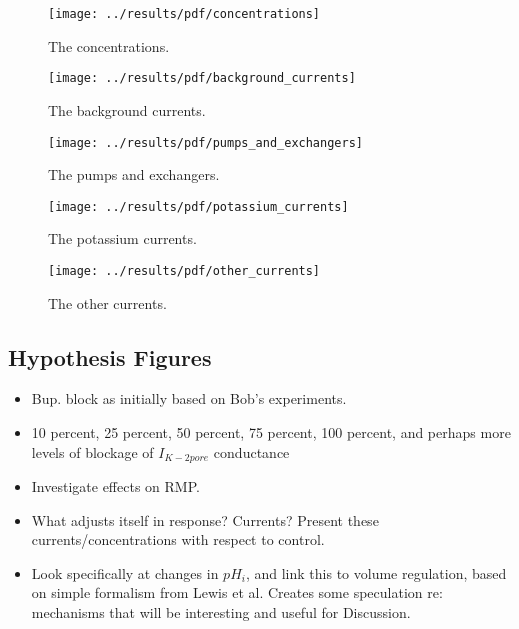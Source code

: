\begin{figure}
  \centering
  \texttt{[image: ../results/pdf/concentrations]}
  \caption{The concentrations.}
  \label{fig:concentrations}
\end{figure}

\begin{figure}
  \centering
  \texttt{[image: ../results/pdf/background\_currents]}
  \caption{The background currents.}
  \label{fig:background-currents}
\end{figure}

\begin{figure}
  \centering
  \texttt{[image: ../results/pdf/pumps\_and\_exchangers]}
  \caption{The pumps and exchangers.}
  \label{fig:pumps-and-exchangers}
\end{figure}

\begin{figure}
  \centering
  \texttt{[image: ../results/pdf/potassium\_currents]}
  \caption{The potassium currents.}
  \label{fig:potassium-currents}
\end{figure}

\begin{figure}
  \centering
  \texttt{[image: ../results/pdf/other\_currents]}
  \caption{The other currents.}
  \label{fig:other-behaviour}
\end{figure}

\subsection{Hypothesis Figures}
\begin{itemize}
\item Bup. block as initially based on Bob's experiments.
\item 10 percent, 25 percent, 50 percent, 75 percent, 100 percent, and
  perhaps more levels of blockage of $I_{K-2pore}$ conductance
\item Investigate effects on RMP.
\item What adjusts itself in response? Currents? Present these
    currents/concentrations with respect to control.
\item Look specifically at changes in $pH_i$, and link this to volume
  regulation, based on simple formalism from Lewis et al. Creates some
  speculation re: mechanisms that will be interesting and useful for
  Discussion.
\end{itemize}

